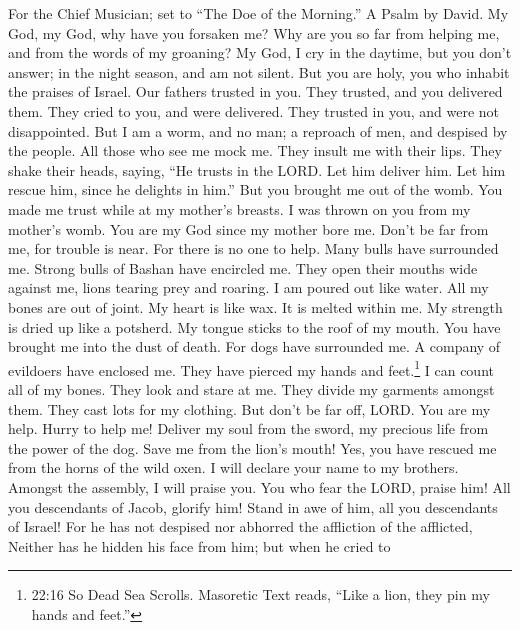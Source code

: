For the Chief Musician; set to ``The Doe of the Morning.'' A Psalm by
David.  My God, my God, why have you forsaken me? Why are
you so far from helping me, and from the words of my groaning?
 My God, I cry in the daytime, but you don't answer; in the
night season, and am not silent.  But you are holy, you who
inhabit the praises of Israel.  Our fathers trusted in you.
They trusted, and you delivered them.  They cried to you,
and were delivered. They trusted in you, and were not disappointed.
 But I am a worm, and no man; a reproach of men, and
despised by the people.  All those who see me mock me. They
insult me with their lips. They shake their heads, saying, 
``He trusts in the LORD. Let him deliver him. Let him rescue him, since
he delights in him.''  But you brought me out of the womb.
You made me trust while at my mother's breasts.  I was
thrown on you from my mother's womb. You are my God since my mother bore
me.  Don't be far from me, for trouble is near. For there
is no one to help.  Many bulls have surrounded me. Strong
bulls of Bashan have encircled me.  They open their mouths
wide against me, lions tearing prey and roaring.  I am
poured out like water. All my bones are out of joint. My heart is like
wax. It is melted within me.  My strength is dried up like
a potsherd. My tongue sticks to the roof of my mouth. You have brought
me into the dust of death.  For dogs have surrounded me. A
company of evildoers have enclosed me. They have pierced my hands and
feet.\footnote{22:16 So Dead Sea Scrolls. Masoretic Text reads, ``Like a
  lion, they pin my hands and feet.''}  I can count all of
my bones. They look and stare at me.  They divide my
garments amongst them. They cast lots for my clothing.  But
don't be far off, LORD. You are my help. Hurry to help me! 
Deliver my soul from the sword, my precious life from the power of the
dog.  Save me from the lion's mouth! Yes, you have rescued
me from the horns of the wild oxen.  I will declare your
name to my brothers. Amongst the assembly, I will praise you.
 You who fear the LORD, praise him! All you descendants of
Jacob, glorify him! Stand in awe of him, all you descendants of Israel!
 For he has not despised nor abhorred the affliction of the
afflicted, Neither has he hidden his face from him; but when he cried to
